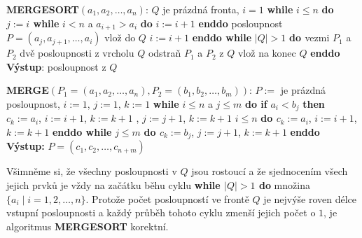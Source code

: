 \documentclass[a4paper,12pt]{article}
\begin{document}
{\bf MERGESORT$(a_1,a_2,\dots,a_n)$}:\newline 
$Q$ je prázdná fronta, $i=1$\newline 
{\bf while} $i\le n$ {\bf do\newline 
\phantom{{\rm ---}}$j:=i$\newline 
\phantom{{\rm ---}}while} $i<n$ a $a_{i+1}>a_i$ {\bf do} $i:=i+1$ {\bf enddo\newline 
\phantom{{\rm ---}}}posloupnost $P=(a_j,a_{j+1},\dots,a_i)$ vlož do $
Q$\newline 
\phantom{---}$i:=i+1$\newline 
{\bf enddo\newline 
while} $|Q|>1$ {\bf do\newline 
\phantom{{\rm ---}}$ $}vezmi $P_1$ a $P_2$ dvě posloupnosti z vrcholu $
Q$\newline 
\phantom{---}odstraň $P_1$ a $P_2$ z $Q$\newline 
\phantom{---}{\bf MERGE$(P_1,P_2)$} vlož na konec $Q$\newline 
{\bf enddo\newline 
Výstup}: posloupnost z $Q$

{\bf MERGE$(P_1=(a_1,a_2,\dots,a_n),P_2=(b_1,b_2,\dots,b_m))$}:\newline 
$P:=$ je prázdná posloupnost, $i:=1$, $j:=1$, $k:=1$\newline 
{\bf while} $i\le n$ a $j\le m$ {\bf do\newline 
\phantom{{\rm ---}}if} $a_i<b_j$ {\bf then\newline 
\phantom{{\rm ------}}$c_k:=a_i$}, $i:=i+1$, $k:=k+1$\newline 
{}, $j:=j+1$, $k:=k+1$\newline 
\phantom{---}{\bf endif\newline 
enddo\newline 
while} $i\le n$ {\bf do\newline 
\phantom{{\rm ---}}$c_k:=a_i$}, $i:=i+1$, $k:=k+1$\newline 
{\bf enddo\newline 
while} $j\le m$ {\bf do\newline 
\phantom{{\rm ---}}$c_k:=b_j$}, $j:=j+1$, $k:=k+1$\newline 
{\bf enddo\newline 
Výstup:} $P=(c_1,c_2,\dots,c_{n+m})$

Všimněme si, že všechny posloupnosti v $Q$ jsou 
rostoucí a že sjednocením všech jejich prvků  
je vždy na začátku běhu cyklu {\bf while 
$|Q|>1$ do} množina $\{a_i\mid i=1,2,\dots,n\}$. 
Protože počet 
posloupností ve frontě $Q$ je nejvýše roven délce vstupní 
posloupnosti a každý průběh tohoto 
cyklu zmenší jejich počet o $1$, je algoritmus {\bf MERGE\-SORT} korektní.
\end{document}
